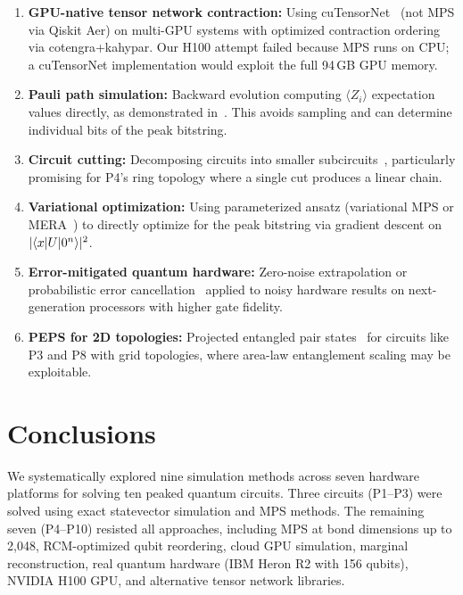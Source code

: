 \documentclass[11pt,a4paper]{article}
\begin{document}
\begin{enumerate}
    \item \textbf{GPU-native tensor network contraction:} Using cuTensorNet~\cite{nvidia2023cutensornet} (not MPS via Qiskit Aer) on multi-GPU systems with optimized contraction ordering via cotengra+kahypar. Our H100 attempt failed because MPS runs on CPU; a cuTensorNet implementation would exploit the full 94\,GB GPU memory.

    \item \textbf{Pauli path simulation:} Backward evolution computing $\langle Z_i \rangle$ expectation values directly, as demonstrated in~\cite{bluequbit2025peaked}. This avoids sampling and can determine individual bits of the peak bitstring.

    \item \textbf{Circuit cutting:} Decomposing circuits into smaller subcircuits~\cite{peng2020simulating}, particularly promising for P4's ring topology where a single cut produces a linear chain.

    \item \textbf{Variational optimization:} Using parameterized ansatz (variational MPS or MERA~\cite{vidal2007entanglement}) to directly optimize for the peak bitstring via gradient descent on $|\!\braket{x|U|0^n}\!|^2$.

    \item \textbf{Error-mitigated quantum hardware:} Zero-noise extrapolation or probabilistic error cancellation~\cite{temme2017error} applied to noisy hardware results on next-generation processors with higher gate fidelity.

    \item \textbf{PEPS for 2D topologies:} Projected entangled pair states~\cite{verstraete2004renormalization} for circuits like P3 and P8 with grid topologies, where area-law entanglement scaling may be exploitable.
\end{enumerate}

\section{Conclusions}
\label{sec:conclusions}

We systematically explored nine simulation methods across seven hardware platforms for solving ten peaked quantum circuits. Three circuits (P1--P3) were solved using exact statevector simulation and MPS methods. The remaining seven (P4--P10) resisted all approaches, including MPS at bond dimensions up to 2{,}048, RCM-optimized qubit reordering, cloud GPU simulation, marginal reconstruction, real quantum hardware (IBM Heron R2 with 156 qubits), NVIDIA H100 GPU, and alternative tensor network libraries.
\end{document}
